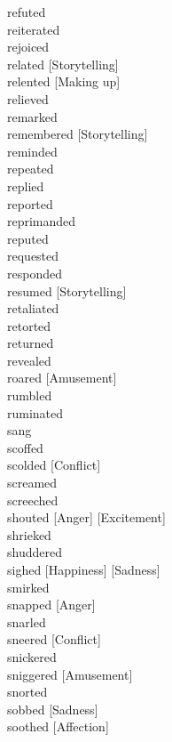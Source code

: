 \documentclass[a4paper,12pt,fleqn]{book}\usepackage{cooltooltips}\usepackage{polyglossia}\setdefaultlanguage[babelshorthands=true]{russian}\setotherlanguage{english}\defaultfontfeatures{Ligatures=TeX,Mapping=tex-text} \usepackage{xcolor}\definecolor{lightgray}{HTML}{bbbbbb}\color{lightgray}\newcommand{\ml}[3]{\textenglish{\textcolor{black}{#3}}}
\begin{document}
{refuted \hfill \\
reiterated \hfill \\
rejoiced \hfill \\
related [Storytelling] \hfill \\
relented [Making up] \hfill \\
relieved \hfill \\
remarked \hfill \\
remembered [Storytelling] \hfill \\
reminded \hfill \\
repeated \hfill \\
replied \hfill \\
reported \hfill \\
reprimanded \hfill \\
reputed \hfill \\
requested \hfill \\
responded \hfill \\
resumed [Storytelling] \hfill \\
retaliated \hfill \\
retorted \hfill \\
returned \hfill \\
revealed \hfill \\
roared [Amusement] \hfill \\
rumbled \hfill \\
ruminated \hfill \\
sang \hfill \\
scoffed \hfill \\
scolded [Conflict] \hfill \\
screamed \hfill \\
screeched \hfill \\
shouted [Anger] [Excitement] \hfill \\
shrieked \hfill \\
shuddered \hfill \\
sighed [Happiness] [Sadness] \hfill \\
smirked \hfill \\
snapped [Anger] \hfill \\
snarled \hfill \\
sneered [Conflict] \hfill \\
snickered \hfill \\
sniggered [Amusement] \hfill \\
snorted \hfill \\
sobbed [Sadness] \hfill \\
soothed [Affection] \hfill \\
}
\end{document}
